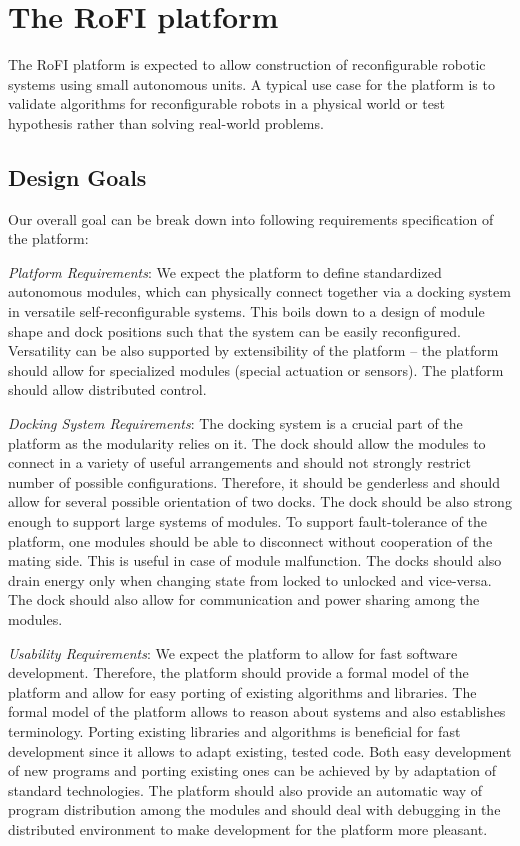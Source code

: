 \chapter{The RoFI platform}\label{chap:rofi}

The RoFI platform is expected to allow construction of reconfigurable robotic
systems using small autonomous units. A typical use case for the platform is to
validate algorithms for reconfigurable robots in a physical world or test
hypothesis rather than solving real-world problems.

\section{Design Goals}\label{sec:design_goals}

Our overall goal can be break down into following requirements specification of
the platform:

\emph{Platform Requirements}: We expect the platform to define standardized
autonomous modules, which can physically connect together via a docking system
in versatile self-reconfigurable systems. This boils down to a design of module
shape and dock positions such that the system can be easily reconfigured.
Versatility can be also supported by extensibility of the platform -- the
platform should allow for specialized modules (special actuation or sensors).
The platform should allow distributed control.

\emph{Docking System Requirements}: The docking system is a crucial part of the
platform as the modularity relies on it. The dock should allow the modules to
connect in a variety of useful arrangements and should not strongly restrict
number of possible configurations. Therefore, it should be genderless and should
allow for several possible orientation of two docks. The dock should be also
strong enough to support large systems of modules. To support fault-tolerance of
the platform, one modules should be able to disconnect without cooperation of
the mating side. This is useful in case of module malfunction. The docks should
also drain energy only when changing state from locked to unlocked and
vice-versa. The dock should also allow for communication and power sharing among
the modules.

\emph{Usability Requirements}: We expect the platform to allow for fast software
development. Therefore, the platform should provide a formal model of the
platform and allow for easy porting of existing algorithms and libraries. The
formal model of the platform allows to reason about systems and also establishes
terminology. Porting existing libraries and algorithms is beneficial for fast
development since it allows to adapt existing, tested code. Both easy
development of new programs and porting existing ones can be achieved by by
adaptation of standard technologies. The platform should also provide an
automatic way of program distribution among the modules and should deal with
debugging in the distributed environment to make development for the platform
more pleasant.

